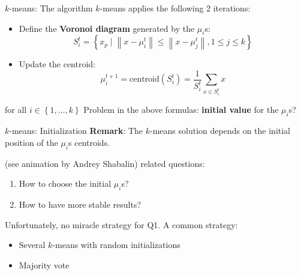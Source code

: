 \documentclass{beamer}
\newcommand{\norm}[1]{\left\lVert#1\right\rVert}
\begin{document}
\begin{frame}{$k$-means: The algorithm}
$k$-means applies the following 2 iterations:
\pause
\begin{itemize}
	\item Define the \textbf{Voronoi diagram} generated by the $\mu_i$s:
	\begin{equation*}
		S_i^t = \left\{ x_p \mid \norm{x - \mu_i^t} \leq \norm{x - \mu_j^t}, 1 \leq j \leq k \right\}
	\end{equation*}
	\pause
	\item Update the centroid:
	\begin{equation*}
		\mu_i^{t+1} = \text{centroid}(S_i^t) = \dfrac{1}{S_i^t} \sum_{x \in S_i^t} x
	\end{equation*}
\end{itemize}
for all $i \in \left\{ 1, \dots, k\right\}$
\vfill
\pause
Problem in the above formulas: \textbf{initial value} for the $\mu_i$s?
\end{frame}

\begin{frame}{$k$-means: Initialization}
\textbf{Remark}: The $k$-means solution depends on the initial position of the $\mu_i$s centroids.

(see animation by Andrey Shabalin)
\vfill
{} related questions:
\begin{enumerate}
	\item How to choose the initial $\mu_i$s?
	\item How to have more stable results?
\end{enumerate}
\vfill
\pause
Unfortunately, no miracle strategy for Q1. A common strategy:
\begin{itemize}
	\item Several $k$-means with random initializations
	\item Majority vote
\end{itemize}
\end{frame}

\begin{frame}
\begin{center}
\end{center}
\end{frame}
\end{document}
